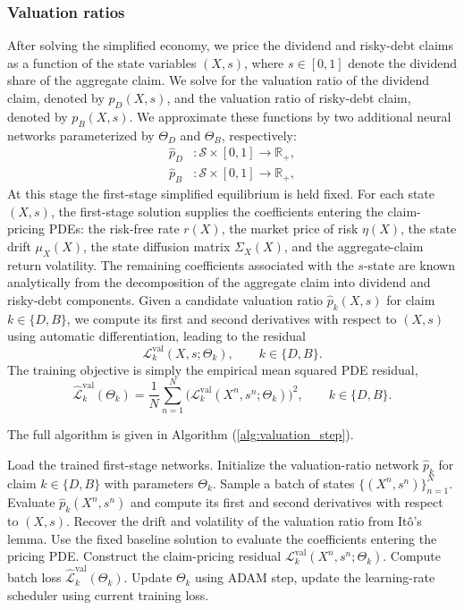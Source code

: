 \subsubsection{Valuation ratios}
After solving the simplified economy, we price the dividend and risky-debt claims as a function of the state variables $(X,s)$, where $s\in[0,1]$ denote the dividend share of the aggregate claim.
We solve for the valuation ratio of the dividend claim, denoted by $p_D(X,s)$, and the valuation ratio of risky-debt claim, denoted by $p_B(X,s)$.
We approximate these functions by two additional neural networks parameterized by $\Theta_D$ and $\Theta_B$, respectively:
\begin{align}
\hat p_D &: \mathcal S\times[0,1]\to\mathbb R_+, \\
\hat p_B&: \mathcal S\times[0,1]\to\mathbb R_+,
\end{align}
At this stage the first-stage simplified equilibrium is held fixed.
For each state $(X,s)$, the first-stage solution supplies the coefficients entering the claim-pricing PDEs: the risk-free rate $r(X)$, the market price of risk $\eta(X)$, the state drift $\mu_X(X)$, the state diffusion matrix $\Sigma_X(X)$, and the aggregate-claim return volatility.
The remaining coefficients associated with the $s$-state are known analytically from the decomposition of the aggregate claim into dividend and risky-debt components.
Given a candidate valuation ratio $\hat p_k(X,s)$ for claim $k\in\{D,B\}$, we compute its first and second derivatives with respect to $(X,s)$ using automatic differentiation, leading to the residual
\[
\mathcal L^{\mathrm{val}}_k(X,s;\Theta_k),
\qquad k\in\{D,B\}.
\]
The training objective is simply the empirical mean squared PDE residual,
\begin{equation}
\widehat{\mathcal L}^{\mathrm{val}}_k(\Theta_k)
=\frac{1}{N}\sum_{n=1}^N
\bigl(\mathcal L^{\mathrm{val}}_k(X^n,s^n;\Theta_k)\bigr)^2,
\qquad k\in\{D,B\}.
\end{equation}

The full algorithm is given in Algorithm (\ref{alg:valuation_step}).


\begin{algorithm}[!t]
 \begin{algorithmic}[1]
 \STATE Load the trained first-stage networks.
 \STATE Initialize the valuation-ratio network $\hat p_k$ for claim $k\in\{D,B\}$ with parameters $\Theta_k$.
 \STATE Sample a batch of states $\{(X^n,s^n)\}_{n=1}^N$.
 \STATE Evaluate $\hat p_k(X^n,s^n)$ and compute its first and second derivatives with respect to $(X,s)$.
 \STATE Recover the drift and volatility of the valuation ratio from It\^o's lemma.
 \STATE Use the fixed baseline solution to evaluate the coefficients entering the pricing PDE.
 \STATE Construct the claim-pricing residual $\mathcal L_k^{\mathrm{val}}(X^n,s^n;\Theta_k)$.
 \STATE Compute batch loss $\widehat{\mathcal L}^{\mathrm{val}}_k(\Theta_k)$.
 \STATE Update $\Theta_k$ using ADAM step, update the learning-rate scheduler using current training loss.
 \ENDFOR
\end{algorithmic}
 \caption{Valuation-ratio step.}
 \label{alg:valuation_step}
\end{algorithm}

